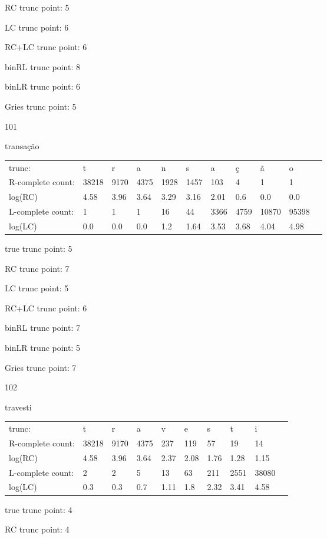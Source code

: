 \documentclass[10pt]{article}
\begin{document}
RC trunc point: 5

LC trunc point: 6

RC+LC trunc point: 6

binRL trunc point: 8

binLR trunc point: 6

Gries trunc point: 5

\newpage

101

transação

\begin{tabular}{l|llllllllll}
trunc: & t & r & a & n & s & a & ç & ã & o & \\ 
R-complete count: & 38218 & 9170 & 4375 & 1928 & 1457 & 103 & 4 & 1 & 1 & \\ 
log(RC) & 4.58 & 3.96 & 3.64 & 3.29 & 3.16 & 2.01 & 0.6 & 0.0 & 0.0 & \\ 
L-complete count: & 1 & 1 & 1 & 16 & 44 & 3366 & 4759 & 10870 & 95398 & \\ 
log(LC) & 0.0 & 0.0 & 0.0 & 1.2 & 1.64 & 3.53 & 3.68 & 4.04 & 4.98 & \\ 
\end{tabular}

true trunc point: 5

RC trunc point: 7

LC trunc point: 5

RC+LC trunc point: 6

binRL trunc point: 7

binLR trunc point: 5

Gries trunc point: 7

\vspace{1em}

102

travesti

\begin{tabular}{l|lllllllll}
trunc: & t & r & a & v & e & s & t & i & \\ 
R-complete count: & 38218 & 9170 & 4375 & 237 & 119 & 57 & 19 & 14 & \\ 
log(RC) & 4.58 & 3.96 & 3.64 & 2.37 & 2.08 & 1.76 & 1.28 & 1.15 & \\ 
L-complete count: & 2 & 2 & 5 & 13 & 63 & 211 & 2551 & 38080 & \\ 
log(LC) & 0.3 & 0.3 & 0.7 & 1.11 & 1.8 & 2.32 & 3.41 & 4.58 & \\ 
\end{tabular}

true trunc point: 4

RC trunc point: 4
\end{document}
